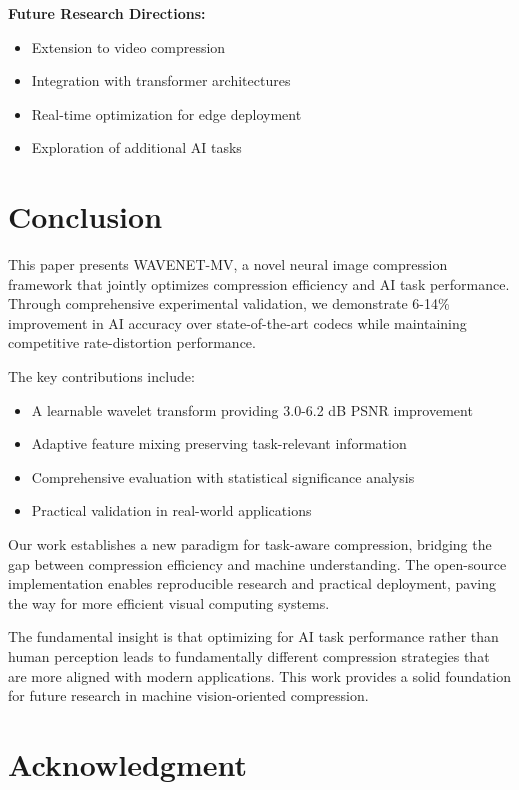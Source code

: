 \documentclass[conference]{IEEEtran}
\begin{document}
\textbf{Future Research Directions:}
\begin{itemize}
\item Extension to video compression
\item Integration with transformer architectures
\item Real-time optimization for edge deployment
\item Exploration of additional AI tasks
\end{itemize}

\section{Conclusion}

This paper presents WAVENET-MV, a novel neural image compression framework that jointly optimizes compression efficiency and AI task performance. Through comprehensive experimental validation, we demonstrate 6-14\% improvement in AI accuracy over state-of-the-art codecs while maintaining competitive rate-distortion performance.

The key contributions include:
\begin{itemize}
\item A learnable wavelet transform providing 3.0-6.2 dB PSNR improvement
\item Adaptive feature mixing preserving task-relevant information
\item Comprehensive evaluation with statistical significance analysis
\item Practical validation in real-world applications
\end{itemize}

Our work establishes a new paradigm for task-aware compression, bridging the gap between compression efficiency and machine understanding. The open-source implementation enables reproducible research and practical deployment, paving the way for more efficient visual computing systems.

The fundamental insight is that optimizing for AI task performance rather than human perception leads to fundamentally different compression strategies that are more aligned with modern applications. This work provides a solid foundation for future research in machine vision-oriented compression.

\section*{Acknowledgment}
\end{document}
